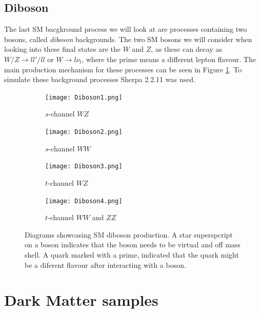 \documentclass[14pt, a4paper]{book}
\begin{document}
\newpage\subsection{Diboson}
The last SM bacgkround process we will look at are processes containing two bosons, called \textit{diboson} backgrounds. The two SM bosons we will consider when looking into these final states are the $W$ and $Z$, as these can decay as $W/Z\rightarrow ll'/ll$ 
or $W\rightarrow l\nu_l$, where the prime means a different lepton flavour. The main production mechanism for these processes can be seen in Figure \ref{fig:Diboson_BKG}. To simulate these background processes Sherpa 2.2.11 \cite{Sherpa} was used.
\begin{figure}[!ht]
    \centering 
    \begin{subfigure}[b]{0.4\textwidth}
        \centering
        \texttt{[image: Diboson1.png]}
        \caption{$s$-channel $WZ$}
    \end{subfigure}
    \hfill
    \begin{subfigure}[b]{0.4\textwidth}
        \centering
        \texttt{[image: Diboson2.png]}
        \caption{$s$-channel $WW$}
    \end{subfigure}
    \hfill
    \begin{subfigure}[b]{0.4\textwidth}
        \centering
        \texttt{[image: Diboson3.png]}
        \caption{$t$-channel $WZ$}
    \end{subfigure}
    \hfill
    \begin{subfigure}[b]{0.4\textwidth}
        \centering
        \texttt{[image: Diboson4.png]}
        \caption{$t$-channel $WW$ and $ZZ$}
    \end{subfigure}
    \caption[Diboson production]{Diagrams showcasing SM diboson production. A star superspcript on a boson indicates that the boson needs to be virtual and off mass shell.  A quark marked with a prime, indicated that the quark might be a diferent flavour after interacting with a boson. }\label{fig:Diboson_BKG}
\end{figure}

\section{Dark Matter samples}
\end{document}
